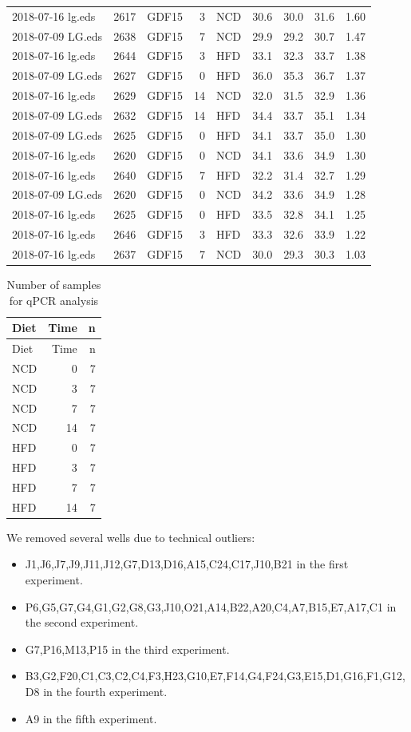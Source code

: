 \documentclass[]{article}
\providecommand{\tightlist}{%
  \setlength{\itemsep}{0pt}\setlength{\parskip}{0pt}}
\begin{document}
\begin{longtable}[]{@{}lllrlrrrr@{}}
2018-07-16 lg.eds & 2617 & GDF15 & 3 & NCD & 30.6 & 30.0 & 31.6 &
1.60\tabularnewline
2018-07-09 LG.eds & 2638 & GDF15 & 7 & NCD & 29.9 & 29.2 & 30.7 &
1.47\tabularnewline
2018-07-16 lg.eds & 2644 & GDF15 & 3 & HFD & 33.1 & 32.3 & 33.7 &
1.38\tabularnewline
2018-07-09 LG.eds & 2627 & GDF15 & 0 & HFD & 36.0 & 35.3 & 36.7 &
1.37\tabularnewline
2018-07-16 lg.eds & 2629 & GDF15 & 14 & NCD & 32.0 & 31.5 & 32.9 &
1.36\tabularnewline
2018-07-09 LG.eds & 2632 & GDF15 & 14 & HFD & 34.4 & 33.7 & 35.1 &
1.34\tabularnewline
2018-07-09 LG.eds & 2625 & GDF15 & 0 & HFD & 34.1 & 33.7 & 35.0 &
1.30\tabularnewline
2018-07-16 lg.eds & 2620 & GDF15 & 0 & NCD & 34.1 & 33.6 & 34.9 &
1.30\tabularnewline
2018-07-16 lg.eds & 2640 & GDF15 & 7 & HFD & 32.2 & 31.4 & 32.7 &
1.29\tabularnewline
2018-07-09 LG.eds & 2620 & GDF15 & 0 & NCD & 34.2 & 33.6 & 34.9 &
1.28\tabularnewline
2018-07-16 lg.eds & 2625 & GDF15 & 0 & HFD & 33.5 & 32.8 & 34.1 &
1.25\tabularnewline
2018-07-16 lg.eds & 2646 & GDF15 & 3 & HFD & 33.3 & 32.6 & 33.9 &
1.22\tabularnewline
2018-07-16 lg.eds & 2637 & GDF15 & 7 & NCD & 30.0 & 29.3 & 30.3 &
1.03\tabularnewline
\bottomrule
\end{longtable}

\begin{longtable}[]{@{}lrr@{}}
\caption{Number of samples for qPCR analysis}\tabularnewline
\toprule
Diet & Time & n\tabularnewline
\midrule
\endfirsthead
\toprule
Diet & Time & n\tabularnewline
\midrule
\endhead
NCD & 0 & 7\tabularnewline
NCD & 3 & 7\tabularnewline
NCD & 7 & 7\tabularnewline
NCD & 14 & 7\tabularnewline
HFD & 0 & 7\tabularnewline
HFD & 3 & 7\tabularnewline
HFD & 7 & 7\tabularnewline
HFD & 14 & 7\tabularnewline
\bottomrule
\end{longtable}

We removed several wells due to technical outliers:

\begin{itemize}
\tightlist
\item
  J1,J6,J7,J9,J11,J12,G7,D13,D16,A15,C24,C17,J10,B21 in the first
  experiment.
\item
  P6,G5,G7,G4,G1,G2,G8,G3,J10,O21,A14,B22,A20,C4,A7,B15,E7,A17,C1 in the
  second experiment.
\item
  G7,P16,M13,P15 in the third experiment.
\item
  B3,G2,F20,C1,C3,C2,C4,F3,H23,G10,E7,F14,G4,F24,G3,E15,D1,G16,F1,G12,D8
  in the fourth experiment.
\item
  A9 in the fifth experiment.
\end{itemize}
\end{document}
